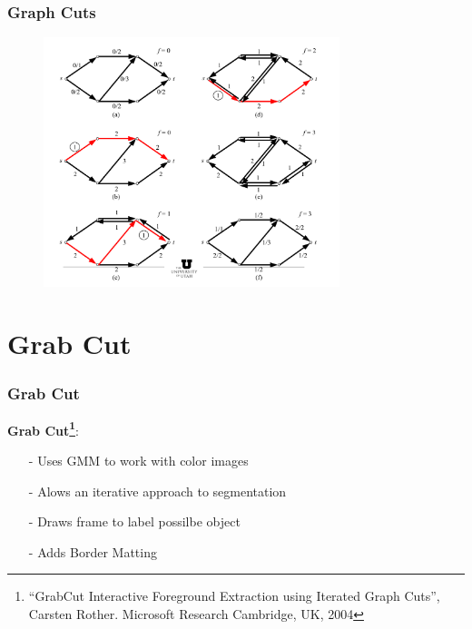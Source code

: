 \documentclass[notheorems,mathserif,table,compress]{beamer}  %
\begin{document}
\begin{frame}
\frametitle{Graph Cuts}
  \begin{figure}[!ht]
  \centering
   \includegraphics[width=3.4in]{flow_road4.png}
   \end{figure}
\end{frame}

\section{Grab Cut}
\begin{frame}
\frametitle{Grab Cut}
\textbf{Grab Cut\footnote{``GrabCut Interactive Foreground Extraction using Iterated Graph Cuts'', Carsten Rother. Microsoft Research Cambridge, UK, 2004}}:
\begin{itemize}
\item[-] Uses {\color{blue} GMM} to work with {\color{blue} color images}
\item[-] Alows an {\color{blue} iterative} approach to segmentation
\item[-] Draws {\color{blue} frame} to label possilbe object
\item[-] Adds {\color{blue} Border Matting}
\end{itemize}
\end{frame}
\end{document}
